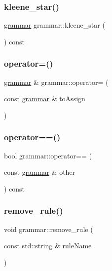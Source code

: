 \mbox{\label{classgrammar_a83ff8da91405eade6d7e991371d57230}} 
\subsubsection{\texorpdfstring{kleene\_star()}{kleene\_star()}}
{\footnotesize\ttfamily \mbox{\hyperlink{classgrammar}{grammar}} grammar\+::kleene\+\_\+star (\begin{DoxyParamCaption}{ }\end{DoxyParamCaption}) const}

\mbox{\label{classgrammar_a3db2c51b19a84c1ce87c3c51dc2920a4}} 
\subsubsection{\texorpdfstring{operator=()}{operator=()}}
{\footnotesize\ttfamily \mbox{\hyperlink{classgrammar}{grammar}} \& grammar\+::operator= (\begin{DoxyParamCaption}\item[{const \mbox{\hyperlink{classgrammar}{grammar}} \&}]{to\+Assign }\end{DoxyParamCaption})}

\mbox{\label{classgrammar_a100c981be6ba64d3dbf00b3a0b5f9625}} 
\subsubsection{\texorpdfstring{operator==()}{operator==()}}
{\footnotesize\ttfamily bool grammar\+::operator== (\begin{DoxyParamCaption}\item[{const \mbox{\hyperlink{classgrammar}{grammar}} \&}]{other }\end{DoxyParamCaption}) const}

\mbox{\label{classgrammar_a63fe5a10e250e6925b0de9dce5b31127}} 
\subsubsection{\texorpdfstring{remove\_rule()}{remove\_rule()}}
{\footnotesize\ttfamily void grammar\+::remove\+\_\+rule (\begin{DoxyParamCaption}\item[{const std\+::string \&}]{rule\+Name }\end{DoxyParamCaption})}

